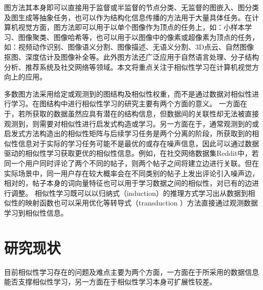 图方法其本身即可以直接用于监督或半监督的节点分类\cite{kipf2016semi,velivckovic2017graph,hamilton2017inductive}、无监督的图嵌入\cite{roweis2000nonlinear,belkin2001laplacian,perozzi2014deepwalk,kipf2016variational}、图分类\cite{shervashidze2011weisfeiler,defferrard2016convolutional,zhang2018end,xu2018how}及图生成\cite{simonovsky2018graphvae,de2018molgan,li2018learning}等抽象任务，也可以作为结构化信息传播的方法用于大量具体任务。在计算机视觉方面，图方法即可以用于以单个图像作为顶点的任务上，如：小样本学习\cite{garcia2018fewshot}、图像聚类\cite{blaschko2008correlational}、图像哈希\cite{weiss2009spectral}等，也可以用于以图像中的像素或超像素为顶点的任务，如：视频动作识别\cite{wang2018non}、图像语义分割\cite{huang2019interlaced}、图像描述\cite{yao2018exploring}、无语义分割\cite{shi2000normalized}、3D点云\cite{wang2019dynamic}、自然图像抠图\cite{levin2008closed}、深度估计\cite{cheng2018depth}及图像补全\cite{yu2018generative}等。此外图方法还广泛应用于自然语言处理\cite{vaswani2017attention}、分子结构分析\cite{kearnes2016molecular}、推荐系统\cite{ying2018graph}及社交网络\cite{hamilton2017inductive}等领域。本文将重点关注于相似性学习在计算机视觉方向上的应用。


多数图方法采用给定或观测到的图结构及相似性权重，而不是通过数据对相似性进行学习。在图结构中进行相似性学习的研究主要有两个方面的意义。
一方面在于，若所获取的数据虽然应具有潜在的结构信息，但数据间的关联性却无法被直接观测到，则需要对相似性进行启发式构造或学习。另一方面在于，通常观测到的或启发式方法构造出的相似性矩阵与后续学习任务是两个分离的阶段，所获取到的相似性信息对于实际的学习任务可能不是最优的或存在噪声信息，因此可以通过数据驱动的相似性学习获取更优的相似性信息。例如，在社交网络数据集Reddit\cite{hamilton2017inductive}中，若同一个用户同时评论了两个不同的帖子，则两个帖子之间将建立边进行关联。但在实际场景中，同一用户存在较大概率会在不同类别的帖子上发出评论引入噪声边，相对的，帖子本身的词向量特征也可以用于学习数据之间的相似性，对已有的边进行调整。
相似性学习既可以以归纳式（induction）的推理方式学习出从数据到相似性的映射函数\cite{meila2001learning}也可以采用优化等转导式（transduction ）方法直接通过观测数据学习到相似性信息\cite{nie2014clustering}。

\section{研究现状}

目前相似性学习存在的问题及难点主要为两个方面，一方面在于所采用的数据信息能否支撑相似性学习，另一方面在于相似性学习本身可扩展性较差。

